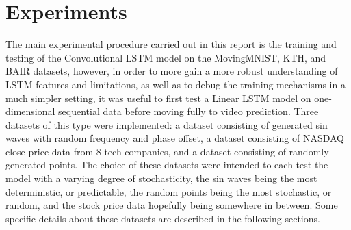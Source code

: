\documentclass{scrartcl}
\begin{document}
%
%
%
%

\newpage
\section{Experiments}
\label{sec:experiments}


The main experimental procedure carried out in this report is the training and
testing of the Convolutional LSTM model on the MovingMNIST, KTH, and BAIR
datasets, however, in order to more gain a more robust understanding of LSTM
features and limitations, as well as to debug the training mechanisms in a much
simpler setting, it was useful to first test a Linear LSTM model on
one-dimensional sequential data before moving fully to video prediction. Three
datasets of this type were implemented: a dataset consisting of generated sin
waves with random frequency and phase offset, a dataset consisting of NASDAQ
close price data from 8 tech companies, and a dataset consisting of randomly
generated points. The choice of these datasets were intended to each test the
model with a varying degree of stochasticity, the sin waves being the most
deterministic, or predictable, the random points being the most stochastic, or
random, and the stock price data hopefully being somewhere in between. Some
specific details about these datasets are described in the following sections.
\end{document}
